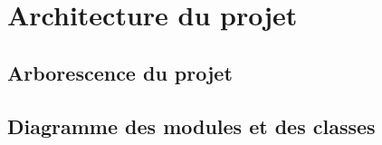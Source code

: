 \chapter{Architecture du projet}

	\section{Arborescence du projet}

	\section{Diagramme des modules et des classes}
